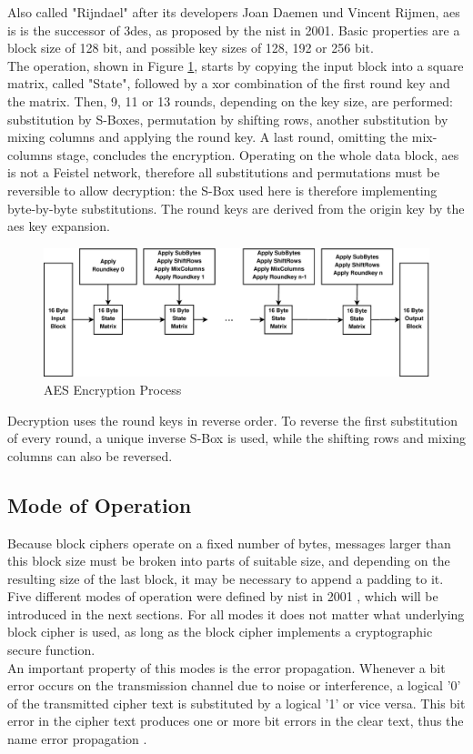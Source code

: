 Also called "Rijndael" after its developers Joan Daemen und Vincent Rijmen, \gls{aes} is is the successor of \gls{3des}, as
proposed by the \gls{nist} in 2001. Basic properties are a block size of 128 bit, and possible key sizes
of 128, 192 or 256 bit.
\\
The operation, shown in Figure \ref{fig:aesEnc}, starts by copying the input block into a square matrix, called "State",
followed by a \gls{xor} combination of the first round 
key and the matrix. Then, 9, 11 or 13 rounds, depending on the key size, are performed: substitution by S-Boxes, permutation by shifting rows, 
another substitution by mixing columns and applying the round key. A last round, omitting the mix-columns stage, concludes the encryption.
Operating on the whole data block, \gls{aes} is not a Feistel network, therefore all substitutions and permutations must be reversible to allow decryption: 
the S-Box used here is therefore implementing byte-by-byte substitutions. The round keys are derived from the origin key by the \gls{aes} key expansion.
\begin{figure}
    \centering
    \includegraphics[width=1\textwidth]{figures/aesEnc.eps}
    \caption{AES Encryption Process}
    \label{fig:aesEnc}
\end{figure}
Decryption uses the round keys in reverse order. To reverse the first substitution of every round, a unique inverse S-Box is used, while the shifting rows
and mixing columns can also be reversed.

\subsection{Mode of Operation}\label{confidentiality}

Because block ciphers  operate on a fixed number of bytes, messages larger than this block size must be broken into parts of suitable size, and depending on 
the resulting size of the last block, it may be necessary to append a padding to it. Five different modes of operation were defined by \gls{nist} in 2001 \cite{moo},
which will be introduced in the next sections. For all modes it does not matter what underlying block cipher is used, as long as the block cipher implements
a cryptographic secure function. 
\\
An important property of this modes is the error propagation.
Whenever a bit error occurs on the transmission channel due to noise or interference,
a logical '0' of the transmitted cipher text is substituted by a logical '1' or vice versa. This bit error in the cipher text produces one or more bit errors
in the clear text, thus the name error propagation \cite{burda}.


